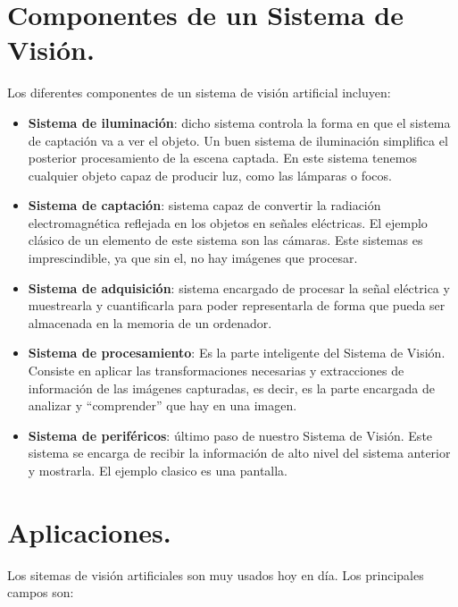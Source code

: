 \documentclass[12pt]{article}
\begin{document}
\section{Componentes de un Sistema de Visión.}

Los diferentes componentes de un sistema de visión artificial incluyen:

\begin{itemize}
	\item \textbf{Sistema de iluminación}: dicho sistema controla la forma en que el sistema de captación va a ver el objeto. Un buen sistema de iluminación simplifica el posterior procesamiento de la escena captada. En este sistema tenemos cualquier objeto capaz de producir luz, como las lámparas o focos.
	\item \textbf{Sistema de captación}: sistema capaz de convertir la radiación electromagnética reflejada en los objetos en señales eléctricas. El ejemplo clásico de un elemento de este sistema son las cámaras. Este sistemas es imprescindible, ya que sin el, no hay imágenes que procesar.
	\item \textbf{Sistema de adquisición}: sistema encargado de procesar la señal eléctrica y muestrearla y cuantificarla para poder representarla de forma que pueda ser almacenada en la memoria de un ordenador.
	\item \textbf{Sistema de procesamiento}: Es la parte inteligente del Sistema de Visión. Consiste en aplicar las transformaciones necesarias y extracciones de información de las imágenes capturadas, es decir, es la parte encargada de analizar y ``comprender'' que hay en una imagen.
	\item \textbf{Sistema de periféricos}: último paso de nuestro Sistema de Visión. Este sistema se encarga de recibir la información de alto nivel del sistema anterior y mostrarla. El ejemplo clasico es una pantalla.
\end{itemize}

\section{Aplicaciones.}

Los sitemas de visión artificiales son muy usados hoy en día. Los principales campos son:
\end{document}
